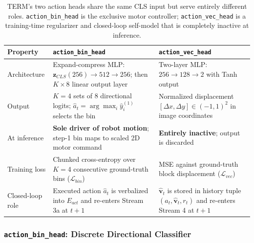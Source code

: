 \documentclass[letterpaper]{article} %
\begin{document}
\begin{table}[t]
\centering
\setlength{\tabcolsep}{4pt}
\small
\begin{tabular}{lp{5.6cm}p{5.6cm}}
\toprule
\textbf{Property} & \textbf{\texttt{action\_bin\_head}} & \textbf{\texttt{action\_vec\_head}} \\
\midrule
Architecture
  & Expand-compress MLP: $\mathbf{z}_{CLS}(256)\!\to\!512\!\to\!256$; then $K{\times}8$ linear output layer
  & Two-layer MLP: $256\!\to\!128\!\to\!2$ with Tanh output \\
Output
  & $K{=}4$ sets of 8 directional logits; $\hat{a}_t {=} \arg\max_i \hat{y}^{(1)}_i$ selects the bin
  & Normalized displacement $[\Delta x, \Delta y] \in (-1,1)^2$ in image coordinates \\
At inference
  & \textbf{Sole driver of robot motion}; step-1 bin maps to scaled 2D motor command
  & \textbf{Entirely inactive}; output is discarded \\
Training loss
  & Chunked cross-entropy over $K{=}4$ consecutive ground-truth bins ($\mathcal{L}_{bin}$)
  & MSE against ground-truth block displacement ($\mathcal{L}_{vec}$) \\
Closed-loop role
  & Executed action $\hat{a}_t$ is verbalized into $E_{act}$ and re-enters Stream 3a at $t{+}1$
  & $\hat{\mathbf{v}}_t$ is stored in history tuple $(a_t, \hat{\mathbf{v}}_t, r_t)$ and re-enters Stream 4 at $t{+}1$ \\
\bottomrule
\end{tabular}
\caption{TERM's two action heads share the same CLS input but serve entirely different roles. \texttt{action\_bin\_head} is the exclusive motor controller; \texttt{action\_vec\_head} is a training-time regularizer and closed-loop self-model that is completely inactive at inference.}
\label{tab:heads}
\end{table}

\subsubsection{\texttt{action\_bin\_head}: Discrete Directional Classifier}
\end{document}
